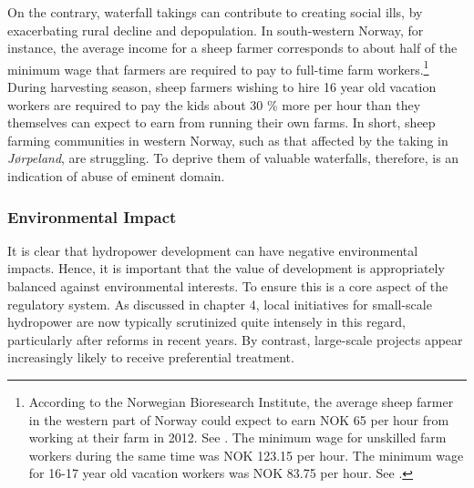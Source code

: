 On the contrary, waterfall takings can contribute to creating social ills, by exacerbating rural decline and depopulation. In south-western Norway, for instance, the average income for a sheep farmer corresponds to about half of the minimum wage that farmers are required to pay to full-time farm workers.\footnote{According to the Norwegian Bioresearch Institute, the average sheep farmer in the western part of Norway could expect to earn NOK 65 per hour from working at their farm in 2012. See \cite[50]{smesdal14}. The minimum wage for unskilled farm workers during the same time was NOK 123.15 per hour. The minimum wage for 16-17 year old vacation workers was NOK 83.75 per hour. See \cite{tariff12}.} During harvesting season, sheep farmers wishing to hire 16 year old vacation workers are required to pay the kids about 30 \% more per hour than they themselves can expect to earn from running their own farms. In short, sheep farming communities in western Norway, such as that affected by the taking in {\it Jørpeland}, are struggling. To deprive them of valuable waterfalls, therefore, is an indication of abuse of eminent domain. %

\subsubsection{Environmental Impact}\label{sec:5:7:6}

It is clear that hydropower development can have negative environmental impacts. Hence, it is important that the value of development is appropriately balanced against environmental interests. To ensure this is a core aspect of the regulatory system. As discussed in chapter 4, local initiatives for small-scale hydropower are now typically scrutinized quite intensely in this regard, particularly after reforms in recent years. By contrast, large-scale projects appear increasingly likely to receive preferential treatment. %
 
